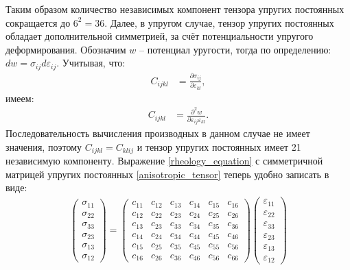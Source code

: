 	Таким образом количество независимых компонент тензора упругих постоянных сокращается до $6^{2} = 36$.
	Далее, в упругом случае, тензор упругих постоянных обладает дополнительной симметрией, за счёт потенциальности упругого деформирования. Обозначим $w$ -- потенциал уругости, тогда по определению: $dw = \sigma_{ij} d\varepsilon_{ij}$.
	Учитывая, что: 
\begin{align}
	C_{ijkl} &= \frac{\partial{\sigma_{ij}}}{\partial{\varepsilon_{kl}}},
\end{align}
	имеем:
\begin{align}
	C_{ijkl} &= \frac{\partial^{2}{w}}{\partial{\varepsilon_{ij}\varepsilon_{kl}}}.
\end{align}
	Последовательность вычисления производных в данном случае не имеет значения, поэтому $C_{ijkl} = C_{klij}$ и тензор упругих постоянных имеет 21 независимую компоненту.
	Выражение \eqref{rheology_equation} с симметричной матрицей упругих постоянных \eqref{anisotropic_tensor} теперь удобно записать в виде:
\begin{align}
\left( \begin{array}{cccccccccccc}
\sigma_{11} \\
\sigma_{22} \\
\sigma_{33} \\
\sigma_{23} \\
\sigma_{13} \\
\sigma_{12} 
\end{array} \right){}
= \left( \begin{array}{cccccccccccc}
c_{11} & c_{12} & c_{13} & c_{14} & c_{15} & c_{16} \\ 
c_{12} & c_{22} & c_{23} & c_{24} & c_{25} & c_{26} \\ 
c_{13} & c_{23} & c_{33} & c_{34} & c_{35} & c_{36} \\ 
c_{14} & c_{24} & c_{34} & c_{44} & c_{45} & c_{46} \\ 
c_{15} & c_{25} & c_{35} & c_{45} & c_{55} & c_{56} \\ 
c_{16} & c_{26} & c_{36} & c_{46} & c_{56} & c_{66}
\end{array} \right){}
\left( \begin{array}{cccccccccccc}
\varepsilon_{11} \\
\varepsilon_{22} \\
\varepsilon_{33} \\
\varepsilon_{23} \\
\varepsilon_{13} \\
\varepsilon_{12}
\end{array} \right)
\end{align}

